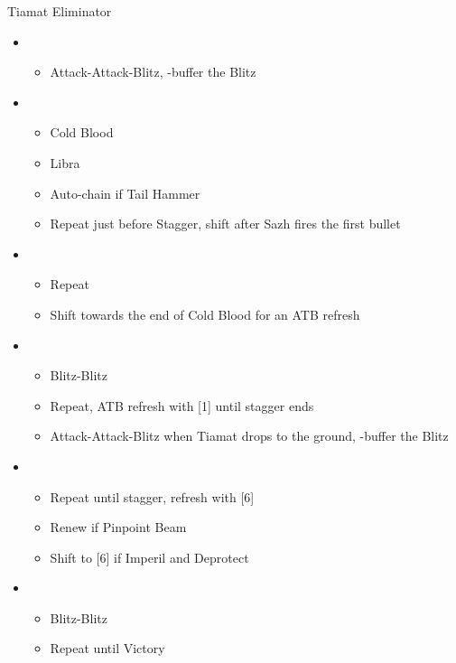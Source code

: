 \documentclass{report}
\begin{document}
\begin{battle}{Tiamat Eliminator}
\begin{itemize}
    \item \fourth
    \begin{itemize}
        \item Attack-Attack-Blitz, \rav-buffer the Blitz
    \end{itemize}
    \item \sixth
    \begin{itemize}
        \item Cold Blood
        \item Libra
        \item Auto-chain if Tail Hammer
        \item Repeat just before Stagger, shift after Sazh fires the first bullet
    \end{itemize}
    \item \third
    \begin{itemize}
        \item Repeat
        \item Shift towards the end of Cold Blood for an ATB refresh
    \end{itemize}
    \item \second
    \begin{itemize}
        \item Blitz-Blitz
        \item Repeat, ATB refresh with [1] until stagger ends
        \item Attack-Attack-Blitz when Tiamat drops to the ground, \rav-buffer the Blitz
    \end{itemize}
    \item \fifth
    \begin{itemize}
        \item Repeat until stagger, refresh with [6]
        \item Renew if Pinpoint Beam
        \item Shift to [6] if Imperil and Deprotect
    \end{itemize}
    \item \second
    \begin{itemize}
        \item Blitz-Blitz
        \item Repeat until Victory
    \end{itemize}
\end{itemize}
\end{battle}
\end{document}

